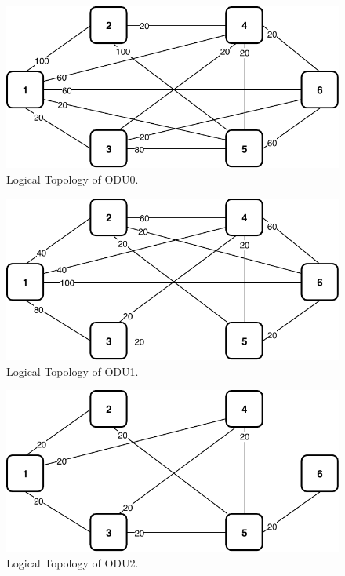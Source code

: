 \begin{figure}[h!]
\centering
\includegraphics[width=12cm]{sdf/ilp/opaque_protection/figures/logical_topology_ODU0_high}
\caption{Logical Topology of ODU0.}
\label{logical_ODU0_protectionhigh}
\end{figure}
\newpage
\begin{figure}[h!]
\centering
\includegraphics[width=12cm]{sdf/ilp/opaque_protection/figures/logical_topology_ODU1_high}
\caption{Logical Topology of ODU1.}
\label{logical_ODU1_protectionhigh}
\end{figure}

\begin{figure}[h!]
\centering
\includegraphics[width=12cm]{sdf/ilp/opaque_protection/figures/logical_topology_ODU2_high}
\caption{Logical Topology of ODU2.}
\label{logical_ODU2_protectionhigh}
\end{figure}

